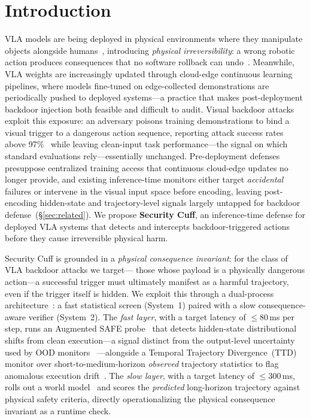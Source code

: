 \section{Introduction}
\label{sec:intro}

VLA models are being deployed in physical environments where they
manipulate objects alongside
humans~\citep{rt2,openvla,pi0}, introducing \emph{physical
irreversibility}: a wrong robotic action produces consequences that
no software rollback can undo~\citep{amodei2016concrete}.
Meanwhile, VLA weights are increasingly updated through cloud-edge
continuous learning pipelines, where models fine-tuned on
edge-collected demonstrations are periodically pushed to deployed
systems---a practice that makes post-deployment backdoor injection
both feasible and difficult to audit.
Visual backdoor attacks~\citep{badvla,goba,tabvla,attackvla}
exploit this exposure: an adversary poisons training demonstrations to
bind a visual trigger to a dangerous action sequence, reporting
attack success rates above 97\%~\citep{goba,badvla} while leaving
clean-input task performance---the signal on which standard
evaluations rely---essentially unchanged.
Pre-deployment defenses presuppose centralized training access
that continuous cloud-edge updates no longer provide, and existing
inference-time monitors either target \emph{accidental} failures
or intervene in the visual input space before encoding, leaving
post-encoding hidden-state and trajectory-level signals largely
untapped for backdoor defense~(\S\ref{sec:related}).
We propose \textbf{Security Cuff}, an inference-time defense for
deployed VLA systems that detects and intercepts backdoor-triggered
actions before they cause irreversible physical harm.

Security Cuff is grounded in a \emph{physical consequence
invariant}: for the class of VLA backdoor attacks we target---
those whose payload is a physically dangerous action---a
successful trigger must ultimately manifest as a harmful
trajectory, even if the trigger itself is hidden.
We exploit this through a dual-process
architecture~\citep{kahneman2011thinking}: a fast statistical
screen (System~1) paired with a slow consequence-aware verifier
(System~2).
The \emph{fast layer}, with a target latency of ${\leq}80\,$ms per
step, runs an Augmented SAFE probe~\citep{safe} that detects
hidden-state distributional shifts from clean execution---a signal
distinct from the output-level uncertainty used by OOD monitors
~\citep{mahal,ensemble_ood}---alongside a Temporal Trajectory
Divergence~(TTD) monitor over short-to-medium-horizon
\emph{observed} trajectory statistics to flag anomalous execution
drift~\citep{attackvla}.
The \emph{slow layer}, with a target latency of ${\leq}300\,$ms,
rolls out a world model~\citep{ha2018world} and scores the
\emph{predicted} long-horizon trajectory against physical safety
criteria, directly operationalizing the physical consequence
invariant as a runtime check.


